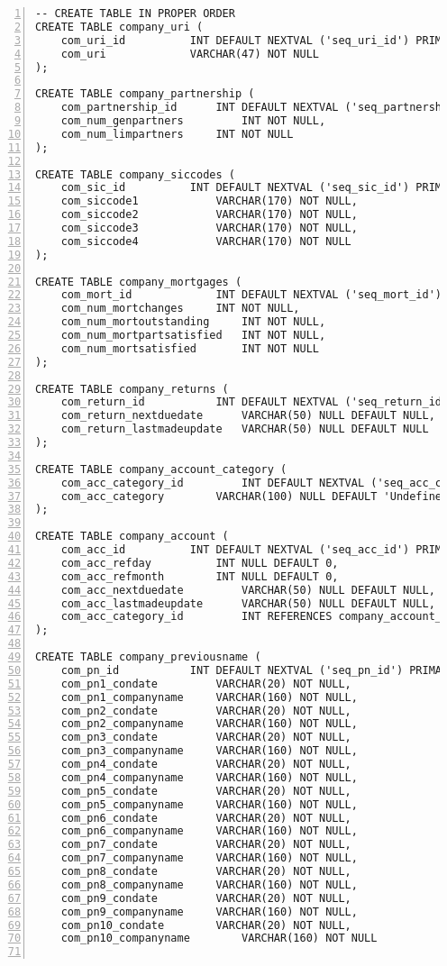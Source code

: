 \begin{lstlisting}[breaklines, frame=single, numbers=left, caption={PL/pgSQL's DDL scripts for Company Normalized Table Creation.}, label=commandline-02]
-- CREATE TABLE IN PROPER ORDER 
CREATE TABLE company_uri (
	com_uri_id 			INT DEFAULT NEXTVAL ('seq_uri_id') PRIMARY KEY,
	com_uri 			VARCHAR(47) NOT NULL
); 

CREATE TABLE company_partnership (
	com_partnership_id 		INT DEFAULT NEXTVAL ('seq_partnership_id') PRIMARY KEY, 
	com_num_genpartners 		INT NOT NULL,
	com_num_limpartners		INT NOT NULL
); 

CREATE TABLE company_siccodes ( 
	com_sic_id 			INT DEFAULT NEXTVAL ('seq_sic_id') PRIMARY KEY, 
	com_siccode1 			VARCHAR(170) NOT NULL,
	com_siccode2 			VARCHAR(170) NOT NULL,
	com_siccode3 			VARCHAR(170) NOT NULL,
	com_siccode4 			VARCHAR(170) NOT NULL
);

CREATE TABLE company_mortgages ( 
	com_mort_id 			INT DEFAULT NEXTVAL ('seq_mort_id') PRIMARY KEY, 
	com_num_mortchanges		INT NOT NULL,
	com_num_mortoutstanding		INT NOT NULL,
	com_num_mortpartsatisfied	INT NOT NULL,
	com_num_mortsatisfied 		INT NOT NULL
);

CREATE TABLE company_returns ( 
	com_return_id 			INT DEFAULT NEXTVAL ('seq_return_id') PRIMARY KEY, 
	com_return_nextduedate		VARCHAR(50) NULL DEFAULT NULL,
	com_return_lastmadeupdate	VARCHAR(50) NULL DEFAULT NULL 
);

CREATE TABLE company_account_category (
	com_acc_category_id 		INT DEFAULT NEXTVAL ('seq_acc_category_id') PRIMARY KEY, 
	com_acc_category 		VARCHAR(100) NULL DEFAULT 'Undefined'
);

CREATE TABLE company_account ( 
	com_acc_id 			INT DEFAULT NEXTVAL ('seq_acc_id') PRIMARY KEY, 
	com_acc_refday			INT NULL DEFAULT 0,
	com_acc_refmonth		INT NULL DEFAULT 0,
	com_acc_nextduedate 		VARCHAR(50) NULL DEFAULT NULL, 
	com_acc_lastmadeupdate		VARCHAR(50) NULL DEFAULT NULL, 
	com_acc_category_id 		INT REFERENCES company_account_category (com_acc_category_id) 
); 

CREATE TABLE company_previousname (
	com_pn_id 			INT DEFAULT NEXTVAL ('seq_pn_id') PRIMARY KEY, 
	com_pn1_condate			VARCHAR(20) NOT NULL,
	com_pn1_companyname		VARCHAR(160) NOT NULL,
	com_pn2_condate			VARCHAR(20) NOT NULL,
	com_pn2_companyname		VARCHAR(160) NOT NULL,
	com_pn3_condate			VARCHAR(20) NOT NULL,
	com_pn3_companyname		VARCHAR(160) NOT NULL,
	com_pn4_condate			VARCHAR(20) NOT NULL,
	com_pn4_companyname		VARCHAR(160) NOT NULL,
	com_pn5_condate			VARCHAR(20) NOT NULL,
	com_pn5_companyname		VARCHAR(160) NOT NULL,
	com_pn6_condate			VARCHAR(20) NOT NULL,
	com_pn6_companyname		VARCHAR(160) NOT NULL,
	com_pn7_condate			VARCHAR(20) NOT NULL,
	com_pn7_companyname		VARCHAR(160) NOT NULL,
	com_pn8_condate			VARCHAR(20) NOT NULL,
	com_pn8_companyname		VARCHAR(160) NOT NULL,
	com_pn9_condate			VARCHAR(20) NOT NULL,
	com_pn9_companyname		VARCHAR(160) NOT NULL,
	com_pn10_condate		VARCHAR(20) NOT NULL,
	com_pn10_companyname		VARCHAR(160) NOT NULL


\end{lstlisting}
